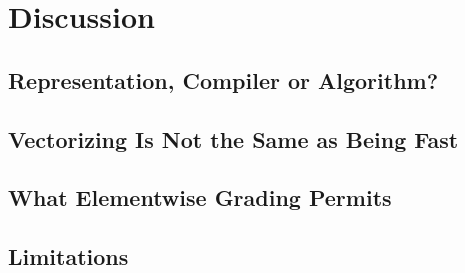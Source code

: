 \chapter{Discussion}
\label{ch:discussion}

\section{Representation, Compiler or Algorithm?}

\section{Vectorizing Is Not the Same as Being Fast}

\section{What Elementwise Grading Permits}

\section{Limitations}
